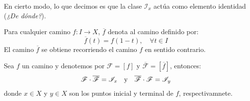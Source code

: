 \documentclass[12pt]{report}
\theoremstyle{largebreak}
\newcommand\cf[3]{\ensuremath{#1:#2\rightarrow#3}}
\begin{document}
    En cierto modo, lo que decimos es que la clase $\mathscr{I}_x$ actúa como elemento identidad (\textit{¿De dónde?}).

    \begin{mydef}
        Para cualquier camino $\cf{f}{I}{X}$, $\overline{f}$ denota al camino definido por:
        \begin{equation*}
            \overline{f}(t)=f(1-t),\quad\forall t\in I
        \end{equation*}
        El camino $\overline{f}$ se obtiene recorriendo el camino $f$ en sentido contrario.
    \end{mydef}

    \begin{lema}
        Sea $f$ un camino y denotemos por $\mathscr{F}=[f]$ y $\overline{\mathscr{F}}=[\overline{f}]$, entonces:
        \begin{equation*}
            \mathscr{F}\cdot\overline{\mathscr{F}}=\mathscr{I}_x\quad\textup{y}\quad\overline{\mathscr{F}}\cdot\mathscr{F}=\mathscr{I}_y
        \end{equation*}
        donde $x\in X$ y $y\in X$ son los puntos inicial y terminal de $f$, respectivamnete.
    \end{lema}
\end{document}

